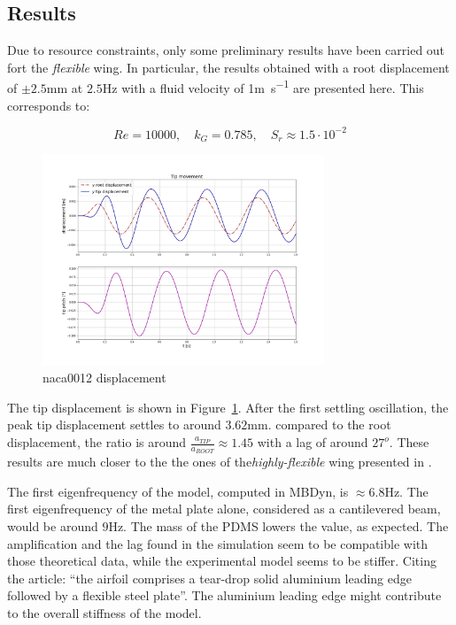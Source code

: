 \subsection{Results}

Due to resource constraints, only some preliminary results have been carried out fort the \textit{flexible} wing. In particular, the results obtained with a root displacement of $\pm2.5$\si{mm} at $2.5$\si{Hz} with a fluid velocity of 1\si{m.s^{-1}} are presented here. This corresponds to:

\begin{equation}
    Re=10000,\quad k_G = 0.785, \quad S_r \approx 1.5\cdot 10^{-2}
\end{equation}

\begin{figure}[ht!]
	\centering
	\includegraphics[width=0.75\textwidth]{images/heathcote/naca0012_disp.png}
	\caption{naca0012 displacement}
	\label{fig:hc-tip-disp}
\end{figure}

The tip displacement is shown in Figure~\ref{fig:hc-tip-disp}. After the first settling oscillation, the peak tip displacement settles to around $3.62$\si{mm}. compared to the root displacement, the ratio is around $\frac{a_{TIP}}{a_{ROOT}} \approx 1.45$ with a lag of around $27^o$. These results are much closer to the the ones of the\textit{highly-flexible} wing presented in \cite{heathcote2008effect}.

The first eigenfrequency of the model, computed in MBDyn, is $\approx6.8$\si{Hz}. The first eigenfrequency of the metal plate alone, considered as a cantilevered beam, would be around $9$\si{Hz}. The mass of the PDMS lowers the value, as expected. The amplification and the lag found in the simulation seem to be compatible with those theoretical data, while the experimental model seems to be stiffer. Citing the article: ``the airfoil comprises a tear-drop solid aluminium leading edge followed by a flexible steel plate''. The aluminium leading edge might contribute to the overall stiffness of the model.  

